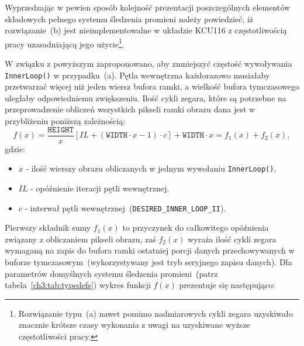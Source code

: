 \begin{enumerate}
Wyprzedzając w pewien sposób kolejność prezentacji poszczególnych elementów składowych pełnego systemu śledzenia promieni należy powiedzieć, iż rozwiązanie~(b) jest nieimplementowalne w układzie KCU116 z częstotliwością pracy uzasadniającą jego użycie\footnote{Rozwiązanie typu~(a) nawet pomimo nadmiarowych cykli zegara uzyskiwało znacznie krótsze czasy wykonania z uwagi na uzyskiwane wyższe częstotliwości pracy.}. 

W związku z powyższym zaproponowano, aby zmniejszyć częstość wywoływania \texttt{InnerLoop()} w przypadku~(a). Pętla wewnętrzna każdorazowo musiałaby przetwarzać więcej niż jeden wiersz bufora ramki, a wielkość bufora tymczasowego uległaby odpowiedniemu zwiększeniu. Ilość cykli zegara, które są potrzebne na przeprowadzenie obliczeń wszystkich pikseli ramki obrazu dana jest w przybliżeniu poniższą zależnością:
\begin{equation}
f(x) = \frac{\mathtt{HEIGHT}}{x}\left[IL + \left(\mathtt{WIDTH}\cdot x - 1 \right) \cdot c \right] + \mathtt{WIDTH}\cdot x = f_1(x) + f_2(x),
\label{ch3:eq:dataflow_latency}
\end{equation}
gdzie:
\begin{itemize}
\item[] $x$ - ilość wierszy obrazu obliczanych w jednym wywołaniu \texttt{InnerLoop()},
\item[] $IL$ - opóźnienie iteracji pętli wewnętrznej,
\item[] $c$ - interwał pętli wewnętrznej~(\texttt{DESIRED\_INNER\_LOOP\_II}).
\end{itemize}
Pierwszy składnik sumy $f_1(x)$ to przyczynek do całkowitego opóźnienia związany z obliczaniem pikseli obrazu, zaś $f_2(x)$ wyraża ilość cykli zegara wymaganą na zapis do bufora ramki ostatniej porcji danych przechowywanych w buforze tymczasowym~(wykorzystywany jest tryb seryjnego zapisu danych). Dla parametrów domyślnych systemu śledzenia promieni~(patrz tabela~\ref{ch3:tab:typedefs}) wykres funkcji $f(x)$ prezentuje się następująco:



\end{enumerate}

